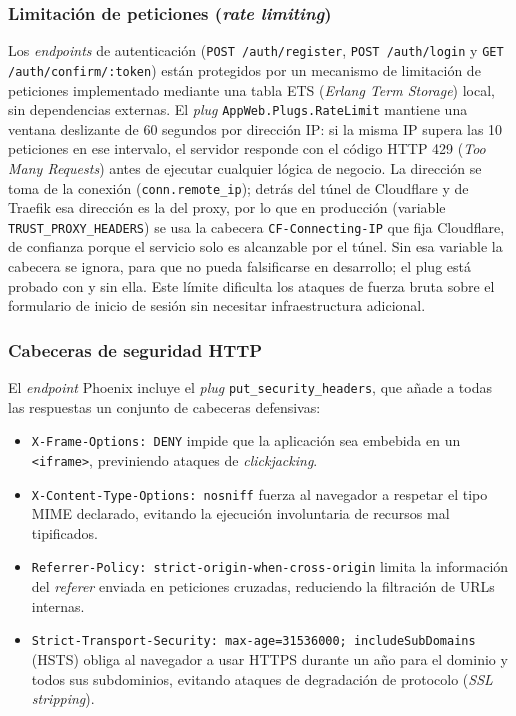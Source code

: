 \subsubsection{Limitación de peticiones (\emph{rate limiting})}

Los \emph{endpoints} de autenticación (\texttt{POST /auth/register}, \texttt{POST /auth/login} y \texttt{GET /auth/confirm/:token}) están protegidos por un mecanismo de limitación de peticiones implementado mediante una tabla ETS (\emph{Erlang Term Storage}) local, sin dependencias externas. El \emph{plug} \texttt{AppWeb.Plugs.RateLimit} mantiene una ventana deslizante de 60 segundos por dirección IP: si la misma IP supera las 10 peticiones en ese intervalo, el servidor responde con el código HTTP 429 (\emph{Too Many Requests}) antes de ejecutar cualquier lógica de negocio. La dirección se toma de la conexión (\texttt{conn.remote\_ip}); detrás del túnel de Cloudflare y de Traefik esa dirección es la del proxy, por lo que en producción (variable \texttt{TRUST\_PROXY\_HEADERS}) se usa la cabecera \texttt{CF-Connecting-IP} que fija Cloudflare, de confianza porque el servicio solo es alcanzable por el túnel. Sin esa variable la cabecera se ignora, para que no pueda falsificarse en desarrollo; el plug está probado con y sin ella. Este límite dificulta los ataques de fuerza bruta sobre el formulario de inicio de sesión sin necesitar infraestructura adicional.

\subsubsection{Cabeceras de seguridad HTTP}

El \emph{endpoint} Phoenix incluye el \emph{plug} \texttt{put\_security\_headers}, que añade a todas las respuestas un conjunto de cabeceras defensivas:

\begin{itemize}
 \item \texttt{X-Frame-Options: DENY} impide que la aplicación sea embebida en un \texttt{<iframe>}, previniendo ataques de \emph{clickjacking}.
 \item \texttt{X-Content-Type-Options: nosniff} fuerza al navegador a respetar el tipo MIME declarado, evitando la ejecución involuntaria de recursos mal tipificados.
 \item \texttt{Referrer-Policy: strict-origin-when-cross-origin} limita la información del \emph{referer} enviada en peticiones cruzadas, reduciendo la filtración de URLs internas.
 \item \texttt{Strict-Transport-Security: max-age=31536000; includeSubDomains} (HSTS) obliga al navegador a usar HTTPS durante un año para el dominio y todos sus subdominios, evitando ataques de degradación de protocolo (\emph{SSL stripping}).
\end{itemize}

